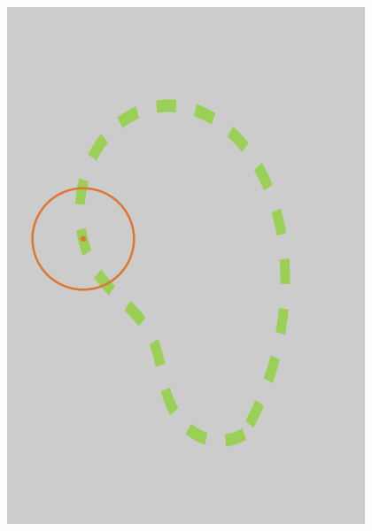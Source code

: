 \begin{frame}
\begin{minipage}[t][0.6\textheight][t]{1\textwidth}
\begin{minipage}{0.35\textwidth}
{\includegraphics[scale=0.5]{figures/non-submodular-elastica/global/issues-3.png}
}
\end{minipage}
\end{minipage}
\end{frame}
